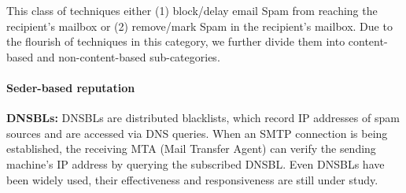 This class of techniques either
	(1) block/delay email Spam from reaching the recipient’s mailbox or
	(2) remove/mark Spam in the recipient’s mailbox.
Due to the flourish of techniques in this category,
	we further divide them into content-based and non-content-based sub-categories.

\paragraph{Seder-based reputation}







		\textbf{DNSBLs:} DNSBLs are distributed blacklists,
			which record IP addresses of spam sources and are accessed via DNS queries.
		When an SMTP connection is being established,
			the receiving MTA (Mail Transfer Agent) can verify the sending machine’s IP address by querying the subscribed DNSBL.
		Even DNSBLs have been widely used,
			their effectiveness and responsiveness \cite{jung_empirical_2004, ramachandran_can} are still under study.

